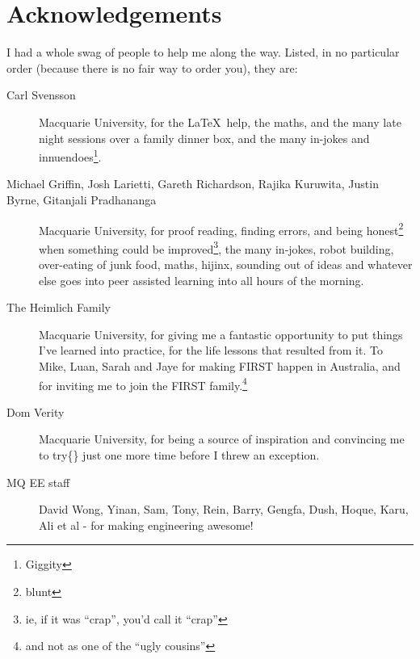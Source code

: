 \chapter{Acknowledgements}
\label{chap:Acknowledgements}
I had a whole swag of people to help me along the way. Listed, in no particular
order (because there is no fair way to order you), they are:
\begin{description}
  \item[Carl Svensson] Macquarie University, for the \LaTeX~help, the maths, and
  the many late night sessions over a family dinner box, and the many in-jokes
  and innuendoes\footnote{Giggity}.
  
  \item[Michael Griffin, Josh Larietti, Gareth Richardson, Rajika Kuruwita,
  Justin Byrne, Gitanjali Pradhananga] Macquarie University, for proof reading,
  finding errors, and being honest\footnote{blunt} when something could be
  improved\footnote{ie,   if it was ``crap'', you'd call it ``crap''}, the many
  in-jokes, robot building, over-eating of junk food, maths, hijinx, sounding
  out of ideas and whatever else goes into peer assisted learning into all hours
  of the morning.
 
  \item[The Heimlich Family] Macquarie University, for giving me a fantastic
  opportunity to put things I've learned into practice, for the life lessons
  that resulted from it. To Mike, Luan, Sarah and Jaye for making FIRST happen
  in Australia, and for inviting me to join the FIRST family.\footnote{and not
  as one of the ``ugly cousins''}
  
  \item[Dom Verity] Macquarie University, for being a source of inspiration and
  convincing me to try\{\} just one more time before I threw an exception.
  
  \item[MQ EE staff] David Wong, Yinan,
  Sam, Tony, Rein, Barry, Gengfa, Dush, Hoque, Karu, Ali et al - for making
  engineering awesome!
  
  

\end{description}
